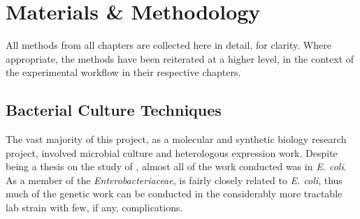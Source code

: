 \chapter{Materials \& Methodology}\label{methods}

All methods from all chapters are collected here in detail, for clarity. Where appropriate, the methods have been reiterated at a higher level, in the context of the experimental workflow in their respective chapters.

%
%
%


\section{Bacterial Culture Techniques}
The vast majority of this project, as a molecular and synthetic biology research project,  involved microbial culture and heterologous expression work. Despite being a thesis on the study of \Pa, almost all of the work conducted was in \emph{E. coli}. As a member of the \emph{Enterobacteriaceae}, \Pa{} is fairly closely related to \emph{E. coli}, thus much of the genetic work can be conducted in the considerably more tractable lab strain with few, if any, complications.

